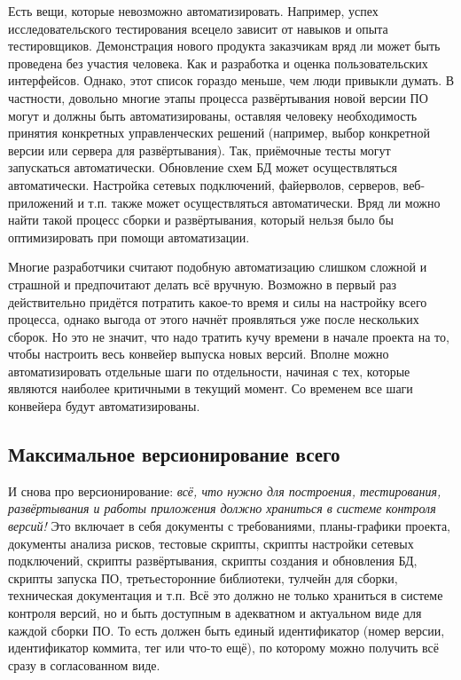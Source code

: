 \documentclass{../../text-style}
\begin{document}
Есть вещи, которые невозможно автоматизировать. Например, успех исследовательского тестирования всецело зависит от навыков и опыта тестировщиков. Демонстрация нового продукта заказчикам вряд ли может быть проведена без участия человека. Как и разработка и оценка пользовательских интерфейсов. Однако, этот список гораздо меньше, чем люди привыкли думать. В частности, довольно многие этапы процесса развёртывания новой версии ПО могут и должны быть автоматизированы, оставляя человеку необходимость принятия конкретных управленческих решений (например, выбор конкретной версии или сервера для развёртывания). Так, приёмочные тесты могут запускаться автоматически. Обновление схем БД может осуществляться автоматически. Настройка сетевых подключений, файерволов, серверов, веб-приложений и т.п. также может осуществляться автоматически. Вряд ли можно найти такой процесс сборки и развёртывания, который нельзя было бы оптимизировать при помощи автоматизации.

Многие разработчики считают подобную автоматизацию слишком сложной и страшной и предпочитают делать всё вручную. Возможно в первый раз действительно придётся потратить какое-то время и силы на настройку всего процесса, однако выгода от этого начнёт проявляться уже после нескольких сборок. Но это не значит, что надо тратить кучу времени в начале проекта на то, чтобы настроить весь конвейер выпуска новых версий. Вполне можно автоматизировать отдельные шаги по отдельности, начиная с тех, которые являются наиболее критичными в текущий момент. Со временем все шаги конвейера будут автоматизированы.

\subsection{Максимальное версионирование всего}

И снова про версионирование: \emph{всё, что нужно для построения, тестирования, развёртывания и работы приложения должно храниться в системе контроля версий!} Это включает в себя документы с требованиями, планы-графики проекта, документы анализа рисков, тестовые скрипты, скрипты настройки сетевых подключений, скрипты развёртывания, скрипты создания и обновления БД, скрипты запуска ПО, третьесторонние библиотеки, тулчейн для сборки, техническая документация и т.п. Всё это должно не только храниться в системе контроля версий, но и быть доступным в адекватном и актуальном виде для каждой сборки ПО. То есть должен быть единый идентификатор (номер версии, идентификатор коммита, тег или что-то ещё), по которому можно получить всё сразу в согласованном виде.
\end{document}
